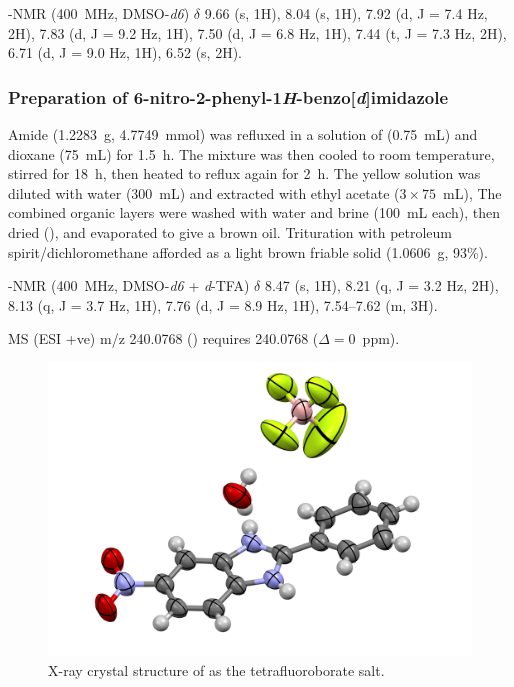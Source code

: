 \begin{refsection}
-NMR (400~MHz, DMSO-\emph{d6}) $\delta$ 9.66 (s, 1H), 8.04 (s, 1H), 7.92 (d, J = 7.4 Hz, 2H), 7.83 (d, J = 9.2 Hz, 1H), 7.50 (d, J = 6.8 Hz, 1H), 7.44 (t, J = 7.3 Hz, 2H), 6.71 (d, J = 9.0 Hz, 1H), 6.52 (s, 2H).

\subsubsection[Preparation of \refcmpd{rhs-nitro}]{Preparation of 6-nitro-2-phenyl-1\emph{H}-benzo[\emph{d}]imidazole }
Amide  (1.2283~g, 4.7749~mmol) was refluxed in a solution of  (0.75~mL) and dioxane (75~mL) for 1.5~h.
The mixture was then cooled to room temperature, stirred for 18~h, then heated to reflux again for 2~h.
The yellow solution was diluted with water (300~mL) and extracted with ethyl acetate ($3\times75$~mL),
The combined organic layers were washed with water and brine (100~mL each), then dried (), and evaporated to give a brown oil.
Trituration with petroleum spirit/dichloromethane afforded  as a light brown friable solid (1.0606~g, 93\%).\autocite{Patrick2017}

-NMR (400~MHz, DMSO-\emph{d6} + \textit{d}-TFA) $\delta$ 8.47 (s, 1H), 8.21 (q, J = 3.2 Hz, 2H), 8.13 (q, J = 3.7 Hz, 1H), 7.76 (d, J = 8.9 Hz, 1H), 7.54--7.62 (m, 3H).

MS (ESI +ve) m/z 240.0768 ()  requires 240.0768 ($\Delta=0$~ppm).

\begin{figure}[ht]
    \centering
    \includegraphics[width=0.8\linewidth]{Figures/rhs-nitro-xray.pdf}
    \caption{X-ray crystal structure of  as the tetrafluoroborate salt.}\label{fig:rhs-nitro-xray}
\end{figure}


\end{refsection}
